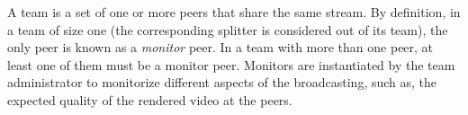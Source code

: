 
\label{sec:team_def}

A team is a set of one or more peers that share the same stream. By
definition, in a team of size one (the corresponding splitter is
considered out of its team), the only peer is known as a
\emph{monitor} peer. In a team with more than one peer, at least one
of them must be a monitor peer. Monitors are instantiated by the team
administrator to monitorize different aspects of the broadcasting,
such as, the expected quality of the rendered video at the peers.
